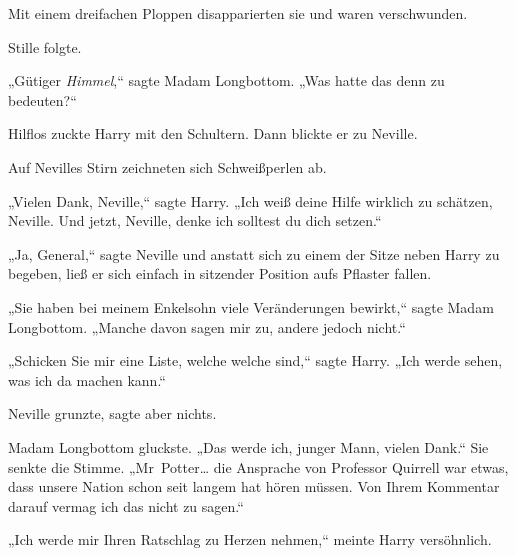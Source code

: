 Mit einem dreifachen Ploppen disapparierten sie und waren verschwunden.

Stille folgte.

„Gütiger \emph{Himmel},“ sagte Madam Longbottom. „Was hatte das denn zu bedeuten?“

Hilflos zuckte Harry mit den Schultern. Dann blickte er zu Neville.

Auf Nevilles Stirn zeichneten sich Schweißperlen ab.

„Vielen Dank, Neville,“ sagte Harry. „Ich weiß deine Hilfe wirklich zu schätzen, Neville. Und jetzt, Neville, denke ich solltest du dich setzen.“

„Ja, General,“ sagte Neville und anstatt sich zu einem der Sitze neben Harry zu begeben, ließ er sich einfach in sitzender Position aufs Pflaster fallen.

„Sie haben bei meinem Enkelsohn viele Veränderungen bewirkt,“ sagte Madam Longbottom. „Manche davon sagen mir zu, andere jedoch nicht.“

„Schicken Sie mir eine Liste, welche welche sind,“ sagte Harry. „Ich werde sehen, was ich da machen kann.“

Neville grunzte, sagte aber nichts.

Madam Longbottom gluckste. „Das werde ich, junger Mann, vielen Dank.“ Sie senkte die Stimme. „Mr~Potter… die Ansprache von Professor Quirrell war etwas, dass unsere Nation schon seit langem hat hören müssen. Von Ihrem Kommentar darauf vermag ich das nicht zu sagen.“

„Ich werde mir Ihren Ratschlag zu Herzen nehmen,“ meinte Harry versöhnlich.

